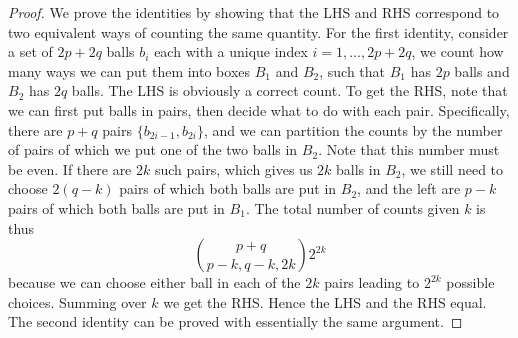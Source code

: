 \begin{proof}
	We prove the identities by showing that the LHS and RHS correspond to two equivalent ways of counting the same quantity. For the first identity, consider a set of $2p+2q$ balls $b_i$ each with a unique index $i = 1,\dotsc,2p+2q$, we count how many ways we can put them into boxes $B_1$ and $B_2$, such that $B_1$ has $2p$ balls and $B_2$ has $2q$ balls. The LHS is obviously a correct count. To get the RHS, note that we can first put balls in pairs, then decide what to do with each pair. Specifically, there are $p+q$ pairs $\{b_{2i-1},b_{2i}\}$, and we can partition the counts by the number of pairs of which we put one of the two balls in $B_2$. Note that this number must be even. If there are $2k$ such pairs, which gives us $2k$ balls in $B_2$, we still need to choose $2(q-k)$ pairs of which both balls are put in $B_2$, and the left are $p-k$ pairs of which both balls are put in $B_1$. The total number of counts given $k$ is thus 
	\[ \binom{p+q}{p-k, q-k, 2k}2^{2k} \]
	because we can choose either ball in each of the $2k$ pairs leading to $2^{2k}$ possible choices. Summing over $k$ we get the RHS. Hence the LHS and the RHS equal. The second identity can be proved with essentially the same argument.
\end{proof}



